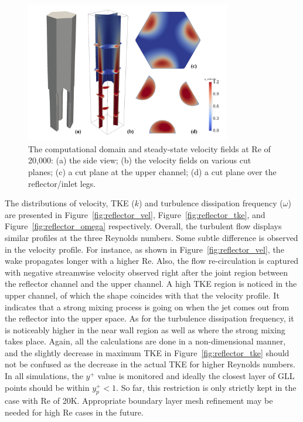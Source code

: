 \begin{figure}[!ht]
\centering
\includegraphics[width=0.8\textwidth]{./figures/reflector_domain.png}
\caption{The computational domain and steady-state velocity fields at Re of 20,000: (a) the side view; (b) the velocity fields on various cut planes; (c) a cut plane at the upper channel; (d) a cut plane over the reflector/inlet legs. }
\label{fig:reflector}
\end{figure}


The distributions of velocity, TKE ($k$) and turbulence dissipation frequency ($\omega$) are presented in Figure~\ref{fig:reflector_vel}, Figure~\ref{fig:reflector_tke}, and Figure~\ref{fig:reflector_omega} respectively. 
Overall, the turbulent flow displays similar profiles at the three Reynolds numbers. Some subtle difference is observed in the velocity profile. For instance, as shown in Figure~\ref{fig:reflector_vel}, the wake propagates longer with a higher Re. Also, the flow re-circulation is captured with negative streamwise velocity observed right after the joint region between the reflector channel and the upper channel. 
A high TKE region is noticed in the upper channel, of which the shape coincides with that the velocity profile. It indicates that a strong mixing process is going on when the jet comes out from the reflector into the upper space. As for the turbulence dissipation frequency, it is noticeably higher in the near wall region as well as where the strong mixing takes place. Again, all the calculations are done in a non-dimensional manner, and the slightly decrease in maximum TKE in Figure~\ref{fig:reflector_tke} should not be confused as the decrease in the actual TKE for higher Reynolds numbers. 
In all simulations, the $y^+$ value is monitored and ideally the closest layer of GLL points should be within $y_p^+ < 1$. So far, this restriction is only strictly kept in the case with Re of 20K. Appropriate boundary layer mesh refinement may be needed for high Re cases in the future. 

